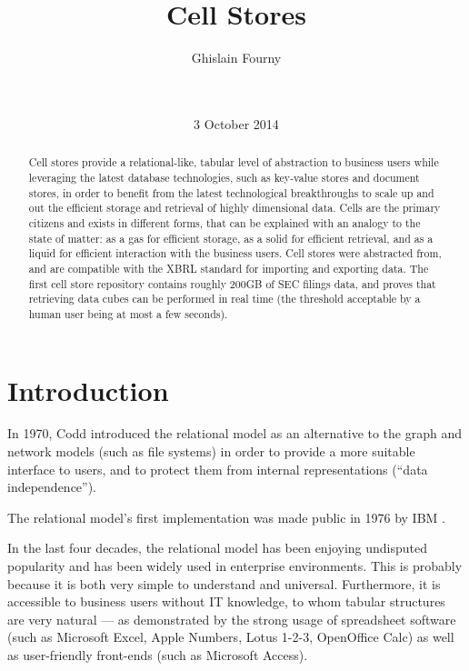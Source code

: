 \documentclass{acm_proc_article-sp}
\begin{document}
\title{Cell Stores}


\author{
\alignauthor
Ghislain Fourny\\
       \\
       \\
}
\date{3 October 2014}
\maketitle

\begin{abstract}
Cell stores provide a relational-like, tabular level of abstraction to business users while leveraging the latest database technologies, such as key-value stores and document stores, in order to benefit from the latest technological breakthroughs to scale up and out the efficient storage and retrieval of highly dimensional data. Cells are the primary citizens and exists in different forms, that can be explained with an analogy to the state of matter: as a gas for efficient storage, as a solid for efficient retrieval, and as a liquid for efficient interaction with the business users. Cell stores were abstracted from, and are compatible with the XBRL standard for importing and exporting data. The first cell store repository contains roughly 200GB of SEC filings data, and proves that retrieving data cubes can be performed in real time (the threshold acceptable by a human user being at most a few seconds).
\end{abstract}


\section{Introduction}
In 1970, Codd \cite{Codd1970} introduced the relational model as an alternative to the graph and network models (such as file systems) in order to provide a more suitable interface to users, and to protect them from internal representations (``data independence'').

The relational model's first implementation was made public in 1976 by IBM \cite{Astrahan1976}.

In the last four decades, the relational model has been enjoying undisputed popularity and has been widely used in enterprise environments. This is probably because it is both very simple to understand and universal. Furthermore, it is accessible to business users without IT knowledge, to whom tabular structures are very natural --- as demonstrated by the strong usage of spreadsheet software \cite{Mattessich1958} \cite{Mattessich1961} (such as Microsoft Excel, Apple Numbers, Lotus 1-2-3, OpenOffice Calc) as well as user-friendly front-ends (such as Microsoft Access).
\end{document}
